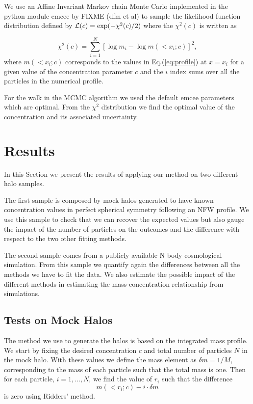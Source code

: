 \documentclass{emulateapj}
\begin{document}
We use an Affine Invariant Markov chain Monte Carlo implemented in the python
module emcee by FIXME (dfm et al) to sample the likelihood
function distribution defined by ${\cal L}(c)=\exp(-\chi^2(c)/2)$
where the $\chi^2(c)$ is written as

\begin{equation}
\chi^2(c)= \sum_{i=1}^{N}[\log m_i - \log m(< x_i;c)]^2,
\end{equation}
%
where $m(<x_i;c)$ corresponds to the values in Eq.(\ref{eq:profile}) at
$x=x_i$ for a given value of the concentration parameter $c$ and the
$i$ index sums over all the particles in the numerical profile.

For the walk in the MCMC algorithm we used the default emcee parameters which
are optimal. From the $\chi^2$ distribution we find the optimal value of the
concentration and  its associated uncertainty.

\section{Results}
\label{sec:results}

In this Section we present the results of applying our method on two
different halo samples.

The first sample is composed by mock halos generated to have known
concentration values in perfect spherical symmetry following an NFW
profile.
We use this sample to check that we can recover the expected values
but also gauge the impact of the number of particles on the outcomes
and the difference with respect to the two other fitting methods.

The second sample comes from a publicly available N-body cosmological
simulation.
From this sample we quantify again the differences between all the
methods we have to fit the data.
We also estimate the possible impact of the different methods in
estimating the mass-concentration relationship from simulations.

\subsection{Tests on Mock Halos}

The method we use to generate the halos is based on the integrated
mass profile.
We start by fixing the desired concentration $c$ and total number of
particles $N$ in the mock halo.
With these values we define the mass element as $\delta m = 1/M$, corresponding
to the mass of each particle such that the total mass is one.
Then for each particle, $i=1,\ldots,N$, we find the value of $r_i$ such that
the difference
%
\begin{equation}
m(<r_i;c) - i \cdot \delta m
\end{equation}
%
is zero using Ridders' method.
\end{document}
